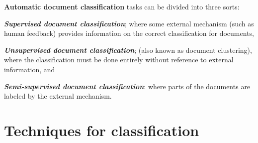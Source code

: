 \documentclass[12pt]{book}
\begin{document}
\textbf{Automatic document classification} tasks can be divided into three sorts: \\
\begin{itemize*}
  \item \textbf{\textit{Supervised document classification}}; where some external mechanism (such as human feedback) provides information on the correct classification for documents, \\
  \item \textbf{\textit{Unsupervised document classification}}; (also known as document clustering), where the classification must be done entirely without reference to external information, and \\
  \item \textbf{\textit{Semi-supervised document classification}}: where parts of the documents are labeled by the external mechanism.
\end{itemize*}


\section{Techniques for classification}
\end{document}
